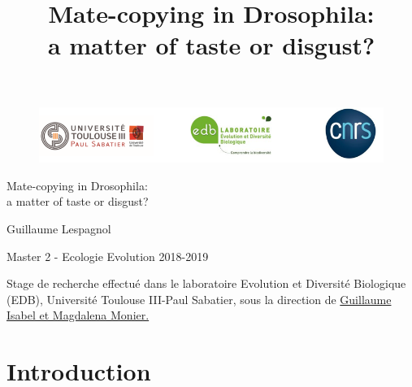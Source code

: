 \documentclass[a4paper, 12pt]{article}
\begin{document}
\title{Mate-copying in Drosophila:\\ a matter of taste or disgust?}		
	\begin{figure}
		\vspace{-1cm}
		\hspace{-2cm}
		\includegraphics[width=20cm]{images/triche}
		
	\end{figure}
	
\vspace*{4cm}

 
\begin{center}\huge Mate-copying in Drosophila:\\a matter of taste or disgust?\end{center}

	
\vspace*{1cm}

\begin{center}Guillaume Lespagnol\end{center}


\begin{center}Master 2 - Ecologie Evolution 2018-2019\end{center}
\vspace*{4cm}

Stage de recherche effectué dans le laboratoire Evolution et Diversité Biologique (EDB), Université Toulouse III-Paul Sabatier, sous la direction de \underline{Guillaume Isabel et Magdalena Monier.}



	
	
	\clearpage
	\vspace*{2cm}
	\tableofcontents
	
	\clearpage



	
\section{Introduction}
\end{document}
